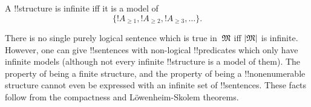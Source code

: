 \documentclass[../../../include/open-logic-section]{subfiles}
\begin{document}
\begin{prop}
A !!{structure} is infinite iff it is a model of
\[
\{!A_{\ge 1}, !A_{\ge 2}, !A_{\ge 3}, \dots \}.
\]
\end{prop}

There is no single purely logical sentence which is true in~$\Struct
M$ iff $\Domain M$ is infinite.  However, one can give !!{sentence}s with
non-logical !!{predicate}s which only have infinite models (although
not every infinite !!{structure} is a model of them).  The property of
being a finite structure, and the property of being a
!!{nonenumerable} structure cannot even be expressed with an infinite
set of !!{sentence}s.  These facts follow from the compactness and
L\"owenheim-Skolem theorems.
\end{document}
